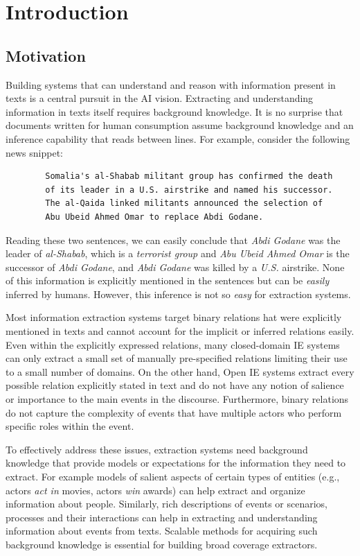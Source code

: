 \section{Introduction}
\subsection{Motivation}

Building systems that can understand and reason with information present in texts is a central pursuit in the AI vision. Extracting and understanding information in texts itself requires background knowledge. It is no surprise that documents written for human consumption assume background knowledge and an inference capability that reads between lines. For example, consider the following news snippet:

\begin{verbatim}
        Somalia's al-Shabab militant group has confirmed the death 
        of its leader in a U.S. airstrike and named his successor. 
        The al-Qaida linked militants announced the selection of 
        Abu Ubeid Ahmed Omar to replace Abdi Godane. 
\end{verbatim}

Reading these two sentences, we can easily conclude that {\em Abdi Godane} was the leader of {\em al-Shabab}, which is a {\em terrorist group} and {\em Abu Ubeid Ahmed Omar} is the successor of {\em Abdi Godane}, and {\em Abdi Godane} was killed by a {\em U.S.} airstrike. None of this information is explicitly mentioned in the sentences but can be {\em easily} inferred by humans. However, this inference is not so {\em easy} for extraction systems. 

Most information extraction systems target binary relations hat were explicitly mentioned in texts and cannot account for the implicit or inferred relations easily. Even within the explicitly expressed relations, many closed-domain IE systems can only extract a small set of manually pre-specified relations limiting their use to a small number of domains. On the other hand, Open IE systems extract every possible relation explicitly stated in text and do not have any notion of salience or importance to the main events in the discourse. Furthermore, binary relations do not capture the complexity of events that have multiple actors who perform specific roles within the event. 

To effectively address these issues, extraction systems need background knowledge that provide models or expectations for the information they need to extract. For example models of salient aspects of certain types of entities (e.g., actors {\em act in} movies, actors {\em win} awards) can help extract and organize information about people. Similarly, rich descriptions of events or scenarios, processes and their interactions can help in extracting and understanding information about events from texts. Scalable methods for acquiring such background knowledge is essential for building broad coverage extractors.

